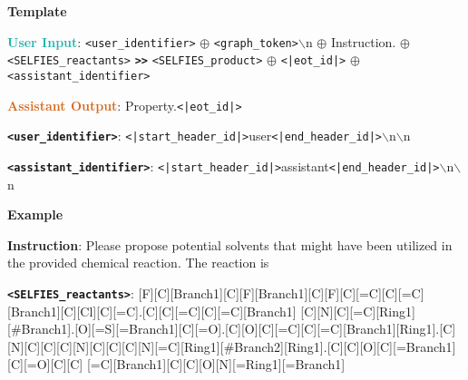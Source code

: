 \begin{tcolorbox}[colback=white!98!black,colframe=white!30!black,boxsep=1.1pt,top=6.75pt]%
\scriptsize
\noindent\makebox[\textwidth]{\rule{\textwidth}{1pt}}
\textbf{Template}
\\[-0.575em]
\noindent\makebox[\textwidth]{\rule{\textwidth}{1pt}}

\textbf{\textcolor[HTML]{20B2AA}{User Input}}: {\tt <user\_identifier>} $\oplus$ {\tt <graph\_token>}$\backslash$n $\oplus$ Instruction. $\oplus$ {\tt <SELFIES\_reactants>} {\tt \textbf{>>}} {\tt <SELFIES\_product>} $\oplus$ {\tt <|eot\_id|>} $\oplus$ {\tt <assistant\_identifier>}

\textbf{\textcolor[HTML]{D2691E}{Assistant Output}}: Property.{\tt <|eot\_id|>}

{\tt \textbf{<user\_identifier>}}: {\tt <|start\_header\_id|>}user{\tt <|end\_header\_id|>}$\backslash$n$\backslash$n

{\tt \textbf{<assistant\_identifier>}}: {\tt <|start\_header\_id|>}assistant{\tt <|end\_header\_id|>}$\backslash$n$\backslash$n

\noindent\makebox[\textwidth]{\rule{\textwidth}{1pt}}
\textbf{Example}
\\[-0.575em]
\noindent\makebox[\textwidth]{\rule{\textwidth}{1pt}}

\begin{tcolorbox}[colback=cyan!7!white,colframe=white!98!black,boxsep=1.1pt,top=6.75pt]
\textbf{Instruction}: Please propose potential solvents that might have been utilized in the provided chemical reaction. The reaction is

{\tt \textbf{<SELFIES\_reactants>}}: 
[F][C][Branch1][C][F][Branch1][C][F][C][=C][C][=C][Branch1][C][Cl][C][=C]\-[Ring1][\#Branch1].[C][C][=C][C][=C][Branch1] [C][N][C][=C][Ring1][\#Branch1].[O][=S][=Branch1][C][=O]\-[Branch2][Ring1][=Branch1][O][Pd][N][C][=C][C][=C][C][=C]\-[Ring1][=Branch1][C][=C][C][=C][C][=C]\-[Ring1][=Branch1][Ring1][=C][C][Branch1][C][F][Branch1][C][F][F].[C][O][C][=C][C][=C][Branch1][Ring1]\-[O][C][C][Branch2][Ring2][=N][P][Branch2][Ring1][Branch1][C][C][C][C][C][Branch1][O][C][C][Branch1]\-[Ring2][C][Ring1][=Branch1][C][Ring1] [=Branch2][C][Ring1][\#Branch2][C][C][C][C][C][Branch1][O][C][C]\-[Branch1][Ring2][C][Ring1][=Branch1][C][Ring1][=Branch2][C][Ring1][\#Branch2] [=C][Ring2][Ring1][=N]\-[C][=C][Branch1][=Branch1][C][Branch1][C][C][C][C][=C][Branch1][=Branch1][C][Branch1][C][C][C][C]\-[=C][Ring1][N][C][Branch1][C][C][C].[C][N][C][C][C][N][C][C][C][N][=C][Ring1][\#Branch2][Ring1]\-[=Branch1].[C][C][O][C][=Branch1][C][=O][C][C] [=C][Branch1][C][C][O][N][=Ring1][=Branch1]


\end{tcolorbox}
\end{tcolorbox}
